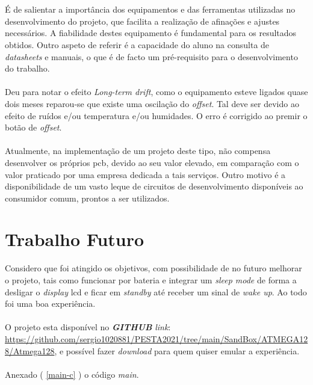 \\
\\
É de salientar a importância dos equipamentos e das ferramentas utilizadas no desenvolvimento do projeto, que facilita a realização de afinações e ajustes necessários. A fiabilidade destes equipamento é fundamental para os resultados obtidos.
Outro aspeto de referir é a capacidade do aluno na consulta de \textit{datasheets} e manuais, o que é de facto um pré-requisito para o desenvolvimento do trabalho.
\\
\\
Deu para notar o efeito \textit{Long-term drift}, como o equipamento esteve ligados quase dois meses reparou-se que existe uma oscilação do \textit{offset}. Tal deve ser devido ao efeito de ruídos e/ou temperatura e/ou humidades. O erro é corrigido ao premir o botão de \textit{offset}.
\\
\\
Atualmente, na implementação de um projeto deste tipo, não compensa desenvolver os próprios \acs{pcb}, devido ao seu valor elevado, em comparação com o valor praticado por uma empresa dedicada a tais serviços. Outro motivo é a disponibilidade  de um vasto leque de circuitos de desenvolvimento disponíveis ao consumidor comum, prontos a ser utilizados.
\section{Trabalho Futuro}
Considero que foi atingido os objetivos, com possibilidade de no futuro melhorar o projeto, tais como funcionar por bateria e integrar um \textit{sleep mode} de forma a desligar o \textit{display} \acs{lcd} e ficar em \textit{standby} até receber um sinal de \textit{wake up}. Ao todo foi uma boa experiência.
\\
\\
O projeto esta disponível no \textit{\textbf{GITHUB}} \textit{link}: \url{https://github.com/sergio1020881/PESTA2021/tree/main/SandBox/ATMEGA128/Atmega128}, e possível fazer \textit{download} para quem quiser emular a experiência.
\\
\\
Anexado ( \ref{main-c} ) o código \textit{main}.
\begin{comment}
Sensitivity,Long-Term Drift e Temperature Effects (Span temperature hysteresis).
\end{comment}
